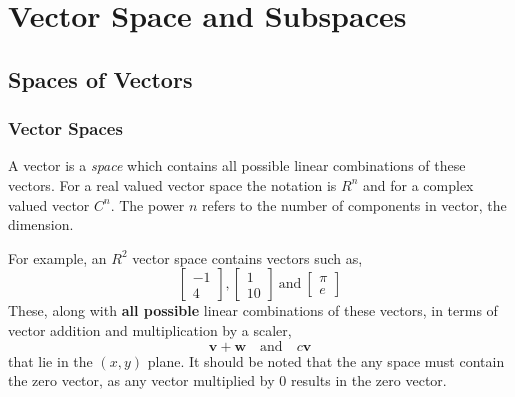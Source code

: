 \section{Vector Space and Subspaces}
    
    \subsection{Spaces of Vectors}
        
        \subsubsection{Vector Spaces}
            A vector is a \textit{space} which contains all possible linear combinations of these vectors. For a real
            valued vector space the notation is \(R^n\) and for a complex valued vector \(C^n\). The power \(n\) refers
            to the number of components in vector, the dimension.
            \par \hfill \break
            For example, an \(R^2\) vector space contains vectors such as,
            \begin{equation}
                \begin{bmatrix}
                    -1 \\
                    4
                \end{bmatrix}
                ,
                \begin{bmatrix}
                    1 \\
                    10
                \end{bmatrix}
                \ \textrm{and} \
                \begin{bmatrix}
                    \pi \\
                    e
                \end{bmatrix}
            \end{equation}
            These, along with \textbf{all possible} linear combinations of these vectors, in terms of vector addition 
            and multiplication by a scaler,
            \begin{equation}
                \boldsymbol{v} + \boldsymbol{w}
                \quad \textrm{and} \quad
                c \boldsymbol{v}
            \end{equation}
            that lie in the \((x,y)\) plane. It should be noted that the any space must contain the zero vector, as any
            vector multiplied by \(0\) results in the zero vector.

